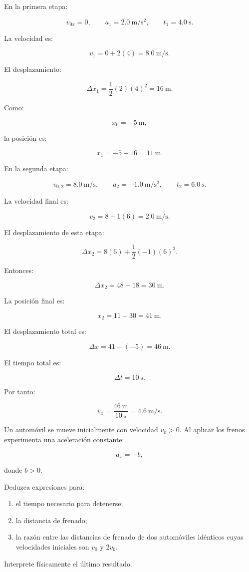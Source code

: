 \begin{explicacion}
En la primera etapa:

\[
v_{0x}=0,
\qquad
a_1=\SI{2.0}{\meter\per\second\squared},
\qquad
t_1=\SI{4.0}{\second}.
\]

La velocidad es:

\[
v_1
=
0+2(4)
=
\boxed{\SI{8.0}{\meter\per\second}}.
\]

El desplazamiento:

\[
\Delta x_1
=
\frac{1}{2}(2)(4)^2
=
\SI{16}{\meter}.
\]

Como:

\[ x_0=-\SI{5}{\meter}, \]

la posición es:

\[
x_1
=
-5+16
=
\boxed{\SI{11}{\meter}}.
\]

En la segunda etapa:

\[
v_{0,2}=\SI{8.0}{\meter\per\second},
\qquad
a_2=-\SI{1.0}{\meter\per\second\squared},
\qquad
t_2=\SI{6.0}{\second}.
\]

La velocidad final es:

\[
v_2
=
8-1(6)
=
\boxed{\SI{2.0}{\meter\per\second}}.
\]

El desplazamiento de esta etapa:

\[
\Delta x_2
=
8(6)
+
\frac{1}{2}(-1)(6)^2.
\]

Entonces:

\[
\Delta x_2
=
48-18
=
\SI{30}{\meter}.
\]

La posición final es:

\[
x_2
=
11+30
=
\boxed{\SI{41}{\meter}}.
\]

El desplazamiento total es:

\[
\Delta x
=
41-(-5)
=
\boxed{\SI{46}{\meter}}.
\]

El tiempo total es:

\[ \Delta t=\SI{10}{\second}. \]

Por tanto:

\[
\bar{v}_x
=
\frac{\SI{46}{\meter}}
{\SI{10}{\second}}
=
\boxed{\SI{4.6}{\meter\per\second}}.
\]
\end{explicacion}


\nivelavanzado


\begin{ejercicio}
Un automóvil se mueve inicialmente con velocidad \(v_0>0\). Al aplicar los frenos experimenta una aceleración constante:

\[ a_x=-b, \]

donde \(b>0\).

Deduzca expresiones para:

\begin{enumerate}[label=\alph*)]
    \item el tiempo necesario para detenerse;
    \item la distancia de frenado;
    \item la razón entre las distancias de frenado de dos automóviles idénticos cuyas velocidades iniciales son \(v_0\) y \(2v_0\).
\end{enumerate}

Interprete físicamente el último resultado.
\end{ejercicio}

